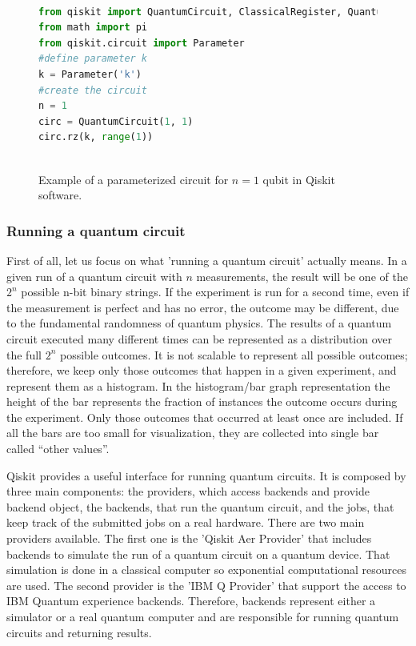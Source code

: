 \begin{figure}[h!]

\begin{lstlisting}[language=Python]%[language=Python, caption=Python example]

from qiskit import QuantumCircuit, ClassicalRegister, QuantumRegister
from math import pi
from qiskit.circuit import Parameter
#define parameter k
k = Parameter('k')
#create the circuit
n = 1
circ = QuantumCircuit(1, 1)
circ.rz(k, range(1))
 
\end{lstlisting}

\caption{\label{ParameterizedCircuit_example} Example of a parameterized circuit for $n=1$ qubit in Qiskit software.}
\end{figure}

\newpage
\subsubsection{Running a quantum circuit}

First of all, let us focus on what 'running a quantum circuit' actually means. In a given run of a quantum circuit with $n$ measurements, the result will be one of the $2^n$ possible n-bit binary strings. If the experiment is run for a second time, even if the measurement is perfect and has no error, the outcome may be different, due to the fundamental randomness of quantum physics. The results of a quantum circuit executed many different times can be represented as a distribution over the full $2^n$ possible outcomes. It is not scalable to represent all possible outcomes; therefore, we keep only those outcomes that happen in a given experiment, and represent them as a histogram. In the histogram/bar graph representation the height of the bar represents the fraction of instances the outcome occurs during the experiment. Only those outcomes that occurred at least once are included. If all the bars are too small for visualization, they are collected into single bar called “other values”. 

Qiskit provides a useful interface for running quantum circuits. It is composed by three main components: the providers, which access backends and provide backend object, the backends, that run the quantum circuit, and the jobs, that keep track of the submitted jobs on a real hardware.  There are two main providers available. The first one is the 'Qiskit Aer Provider' that includes backends to simulate the run of a quantum circuit on a quantum device. That simulation is done in a classical computer so exponential computational resources are used. The second provider is the 'IBM Q Provider' that support the access to IBM Quantum experience backends. 
Therefore, backends represent either a simulator or a real quantum computer and are responsible for running quantum circuits and returning results. 

